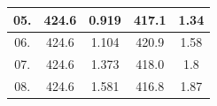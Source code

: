 \documentclass[a4paper,12pt]{article}
\begin{document}
\begin{table}[H]
\begin{tabular}{|c|c|c|c|c|}
			05.              & 424.6                                                                     & 0.919                                                              & 417.1                                                                  & 1.34                                                                \\ \hline
			06.              & 424.6                                                                     & 1.104                                                              & 420.9                                                                  & 1.58                                                                \\ \hline
			07.              & 424.6                                                                     & 1.373                                                              & 418.0                                                                  & 1.8                                                                 \\ \hline
			08.              & 424.6                                                                     & 1.581                                                              & 416.8                                                                  & 1.87                                                                \\ \hline
		\end{tabular}
	\end{table}
	
\end{document}
